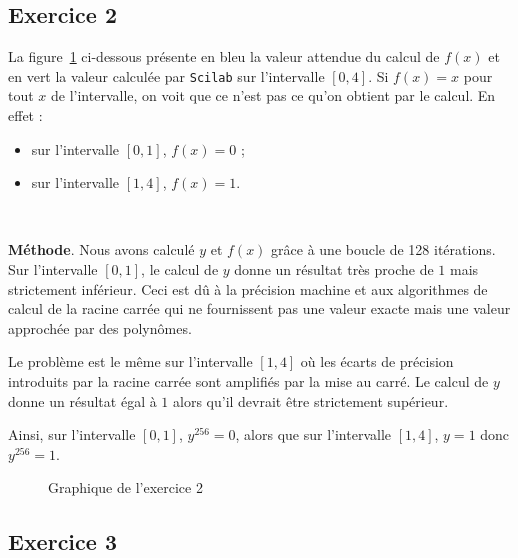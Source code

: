 \documentclass[a4paper,11pt]{article}
\theoremstyle{nonumberplain}
\theoremstyle{nonumberplain}
\theoremstyle{nonumberplain}
\begin{document}
\subsection*{Exercice 2}

    La figure~\ref{graph_exo2} ci-dessous présente en bleu la valeur attendue du calcul de $f(x)$ et en vert la valeur calculée par \texttt{Scilab} sur l'intervalle $[0, 4]$.
    Si $f(x) = x$ pour tout $x$ de l'intervalle, on voit que ce n'est pas ce qu'on obtient par le calcul. En effet :

    \begin{itemize}
        \item sur l'intervalle $[0, 1]$, $f(x) = 0$ ;
        \item sur l'intervalle $[1, 4]$, $f(x) = 1$.
    \end{itemize}~\newline

    \textbf{Méthode}. Nous avons calculé $y$ et $f(x)$ grâce à une boucle de 128 itérations.
    Sur l'intervalle $[0, 1]$, le calcul de $y$ donne un résultat très proche de $1$ mais strictement inférieur. Ceci est dû à la précision machine
    et aux algorithmes de calcul de la racine carrée qui ne fournissent pas une valeur exacte mais une valeur approchée par des polynômes.

    Le problème est le même sur l'intervalle $[1, 4]$ où les écarts de précision introduits par la racine carrée sont amplifiés par la mise au carré. Le calcul de $y$ donne
    un résultat égal à $1$ alors qu'il devrait être strictement supérieur.

    Ainsi, sur l'intervalle $[0, 1]$, $y^{256} = 0$, alors que sur l'intervalle $[1, 4]$, $y = 1$ donc $y^{256} = 1$.

    \begin{figure}
        \centering
        \caption{\label{graph_exo2} Graphique de l'exercice 2}
    \end{figure}


\subsection*{Exercice 3}
\end{document}

